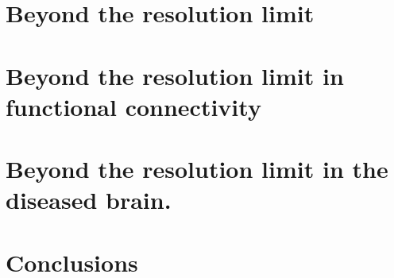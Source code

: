 \chapter{Beyond the resolution limit}\label{chap:beyondresolutionlimit}


\chapter{Beyond the resolution limit in functional connectivity}\label{chap:beyondresolutionlimitfunctionalconnectivity}


\chapter{Beyond the resolution limit in the diseased brain.}


\chapter{Conclusions}\label{chap:conclusions}







% 
% 

%
